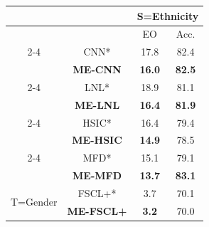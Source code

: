 \begin{table}[h]
\begin{tabular}{c|c|c|c}
\hline
                              &                             & \multicolumn{2}{c}{S=Ethnicity}         \\ \hline
                              &                             & EO                               & Acc.          \\ \cline{2-4}
\multirow{8}{*}{T=Age}        & CNN*                        & 17.8                             & 82.4          \\ 
                              & \textbf{ME-CNN}             & \textbf{16.0}                    & \textbf{82.5} \\ \cline{2-4}
                              & LNL*                        & 18.9                             & 81.1          \\ 
                              & \textbf{ME-LNL}             & \textbf{16.4}                    & \textbf{81.9} \\ \cline{2-4}
                              & HSIC*                       & 16.4                             & 79.4          \\ 
                              & \textbf{ME-HSIC}            & \textbf{14.9}                    & 78.5          \\ \cline{2-4}
                              & MFD*                        & 15.1                             & 79.1          \\ 
                              & \textbf{ME-MFD}             & \textbf{13.7}                    & \textbf{83.1} \\ \hline
\multirow{2}{*}{T=Gender}     & FSCL+*                      & 3.7                              & 70.1 \\ 
                              & \textbf{ME-FSCL+}           & \textbf{3.2}                     & 70.0  \\ \hline
\end{tabular}

\end{table}

